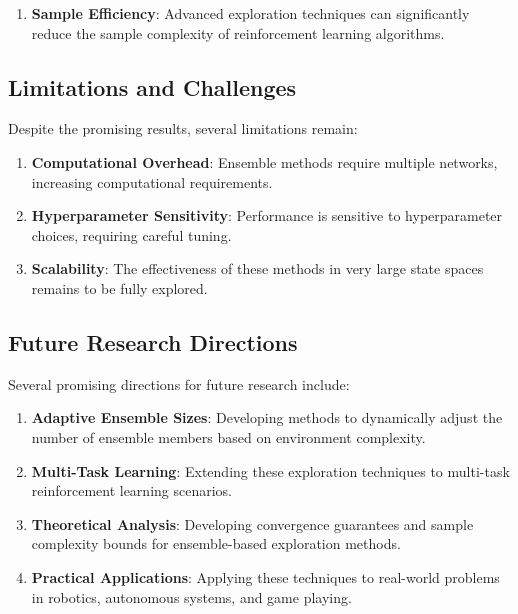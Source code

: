 \documentclass[12pt]{article}
\begin{document}
{{{\begin{enumerate}
    \item \textbf{Sample Efficiency}: Advanced exploration techniques can significantly reduce the sample complexity of reinforcement learning algorithms.
\end{enumerate}

\subsection{Limitations and Challenges}

Despite the promising results, several limitations remain:

\begin{enumerate}
    \item \textbf{Computational Overhead}: Ensemble methods require multiple networks, increasing computational requirements.
    
    \item \textbf{Hyperparameter Sensitivity}: Performance is sensitive to hyperparameter choices, requiring careful tuning.
    
    \item \textbf{Scalability}: The effectiveness of these methods in very large state spaces remains to be fully explored.
\end{enumerate}

\subsection{Future Research Directions}

Several promising directions for future research include:

\begin{enumerate}
    \item \textbf{Adaptive Ensemble Sizes}: Developing methods to dynamically adjust the number of ensemble members based on environment complexity.
    
    \item \textbf{Multi-Task Learning}: Extending these exploration techniques to multi-task reinforcement learning scenarios.
    
    \item \textbf{Theoretical Analysis}: Developing convergence guarantees and sample complexity bounds for ensemble-based exploration methods.
    
    \item \textbf{Practical Applications}: Applying these techniques to real-world problems in robotics, autonomous systems, and game playing.
\end{enumerate}

}}}
\end{document}
